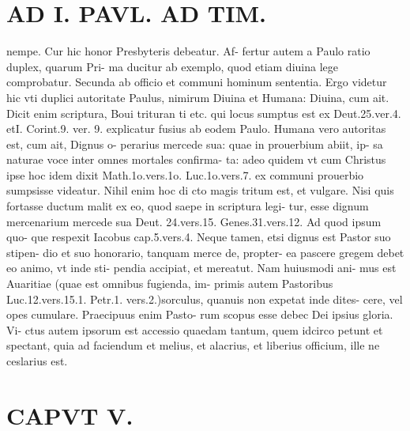 \documentclass{article}
\begin{document}
\begin{pages}
\section*{AD I. PAVL. AD TIM. }
\marginpar{[ p.310 ]}\pstart nempe. Cur hic honor Presbyteris debeatur. Af- fertur autem a Paulo ratio duplex, quarum Pri- ma ducitur ab exemplo, quod etiam diuina lege comprobatur. Secunda ab officio et communi hominum sententia. Ergo videtur hic vti duplici autoritate Paulus, nimirum Diuina et Humana: Diuina, cum ait. Dicit enim scriptura, Boui trituran ti etc. qui locus sumptus est ex Deut.25.ver.4. etI. Corint.9. ver. 9. explicatur fusius ab eodem Paulo. Humana vero autoritas est, cum ait, Dignus o- perarius mercede sua: quae in prouerbium abiit, ip- sa naturae voce inter omnes mortales confirma- ta: adeo quidem vt cum Christus ipse hoc idem dixit Math.1o.vers.1o. Luc.1o.vers.7. ex communi prouerbio sumpsisse videatur. Nihil enim hoc di cto magis tritum est, et vulgare. Nisi quis fortasse ductum malit ex eo, quod saepe in scriptura legi- tur, esse dignum mercenarium mercede sua Deut. 24.vers.15. Genes.31.vers.12. Ad quod ipsum quo- que respexit Iacobus cap.5.vers.4. Neque tamen, etsi dignus est Pastor suo stipen- dio et suo honorario, tanquam merce de, propter- ea pascere gregem debet eo animo, vt inde sti- pendia accipiat, et mereatut. Nam huiusmodi ani- mus est Auaritiae (quae est omnibus fugienda, im- primis autem Pastoribus Luc.12.vers.15.1. Petr.1. vers.2.)sorculus, quanuis non expetat inde dites- cere, vel opes cumulare. Praecipuus enim Pasto- rum scopus esse debec Dei ipsius gloria. Vi- ctus autem ipsorum est accessio quaedam tantum, quem idcirco petunt et spectant, quia ad faciendum et melius, et alacrius, et liberius officium, ille ne ceslarius est.  \pend
\section*{CAPVT V. }
\marginpar{[ p.311 ]}\pstart {}
{}

\end{pages}
\end{document}
